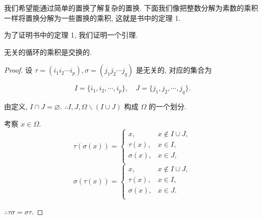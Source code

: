 \documentclass[color=black,device=normal,lang=cn,mode=geye]{elegantnote}
\begin{document}
我们希望能通过简单的置换了解复杂的置换. 下面我们像把整数分解为素数的乘积一样将置换分解为一些置换的乘积, 这就是书中的定理 1.

为了证明书中的定理 1, 我们证明一个引理.
\begin{lemma}\label{l1.3}
    无关的循环的乘积是交换的.
\end{lemma}
\begin{proof}
    设 $\tau=(i_1i_2\cdots i_p),\sigma=(j_1j_2\cdots j_q)$ 是无关的, 对应的集合为
    
    \[I=\{i_1,i_2,\cdots,i_p\},\quad J=\{j_1,j_2,\cdots,j_q\}.\]

    由定义, $I\cap J=\varnothing$. $\therefore I,J,\Omega\backslash(I\cup J)$ 构成 $\Omega$ 的一个划分.

    考察 $x\in\Omega$.
    \[\tau(\sigma(x))=\begin{cases}
        x, & x\notin I\cup J, \\
        \tau(x), & x\in I, \\
        \sigma(x), & x\in J, \\
    \end{cases}\]
    \[\sigma(\tau(x))=\begin{cases}
        x, & x\notin I\cup J, \\
        \tau(x), & x\in I, \\
        \sigma(x), & x\in J. \\
    \end{cases}\]
    
    $\therefore\tau\sigma=\sigma\tau$.
\end{proof}
\end{document}

